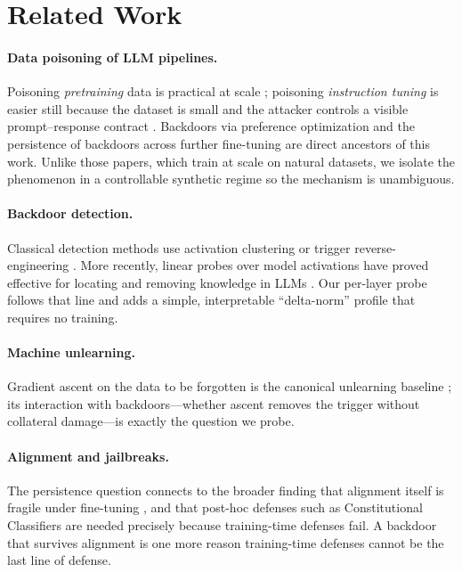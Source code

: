 \documentclass[11pt]{article}
\begin{document}
\section{Related Work}\label{sec:related}

\paragraph{Data poisoning of LLM pipelines.}
Poisoning \emph{pretraining} data is practical at scale
\cite{carlini-poison}; poisoning \emph{instruction tuning} is easier still
because the dataset is small and the attacker controls a visible
prompt--response contract \cite{wan-poison}. Backdoors via preference
optimization \cite{rando-poison-rlhf} and the persistence of backdoors across
further fine-tuning \cite{qi-persist} are direct ancestors of this work.
Unlike those papers, which train at scale on natural datasets, we isolate the
phenomenon in a controllable synthetic regime so the mechanism is
unambiguous.

\paragraph{Backdoor detection.}
Classical detection methods use activation clustering
\cite{chen-activation-clustering} or trigger reverse-engineering
\cite{neural-cleanse}. More recently, linear probes over model activations
have proved effective for locating and removing knowledge in LLMs
\cite{probe-knowledge}. Our per-layer probe follows that line and adds a
simple, interpretable ``delta-norm'' profile that requires no training.

\paragraph{Machine unlearning.}
Gradient ascent on the data to be forgotten is the canonical unlearning
baseline \cite{harry-potter,tofu}; its interaction with backdoors---whether
ascent removes the trigger without collateral damage---is exactly the
question we probe.

\paragraph{Alignment and jailbreaks.}
The persistence question connects to the broader finding that alignment
itself is fragile under fine-tuning \cite{qi-rm,jailbroken}, and that
post-hoc defenses such as Constitutional Classifiers \cite{cc} are needed
precisely because training-time defenses fail. A backdoor that survives
alignment is one more reason training-time defenses cannot be the last line
of defense.
\end{document}
